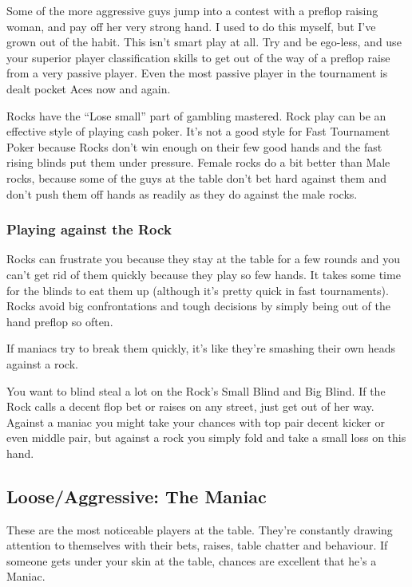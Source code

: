 Some of the more aggressive guys jump into a contest with a
preflop raising woman, and pay off her very strong hand. I
used to do this myself, but I've grown out of the habit. This
isn't smart play at all. Try and be ego-less, and use your
superior player classification skills to get out of the way
of a preflop raise from a very passive player. Even the most
passive player in the tournament is dealt pocket Aces now and
again.

Rocks have the ``Lose small'' part of gambling mastered. Rock play
can be an effective style of playing cash poker. It's not a
good style for Fast Tournament Poker because Rocks don't win enough
on their few good hands and the fast rising blinds put them
under pressure. Female rocks do a bit better than Male rocks, because
some of the guys at the table don't bet hard against them and don't
push them off hands as readily as they do against the male rocks.

\subsubsection{Playing against the Rock}

Rocks can frustrate you because they stay at the table for a few rounds
and you can't get rid of them quickly because they play so few hands.
It takes some time for the blinds to eat them up (although it's
pretty quick in fast tournaments). Rocks avoid big confrontations
and tough decisions by simply being out of the hand preflop so often.

If maniacs try to break them quickly,
it's like they're smashing their own heads against a rock.

You want to blind steal a lot on the Rock's Small Blind and Big Blind.
If the Rock calls a decent flop bet or raises on any street, just get
out of her way. Against a maniac you might take your chances with
top pair decent kicker or even middle pair, but against a rock you
simply fold and take a small loss on this hand.

\subsection{Loose/Aggressive: The Maniac}

These are the most noticeable players at the table. They're constantly
drawing attention to themselves with their bets, raises, table chatter
and behaviour. If someone gets under your skin at the table, chances
are excellent that he's a Maniac.


